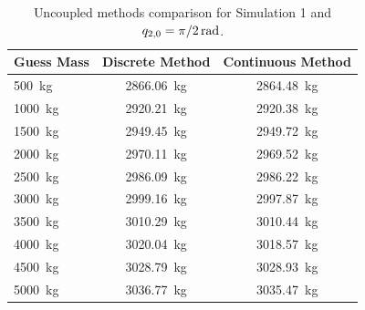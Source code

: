 \documentclass[a4paper,12pt,oneside]{report}
\begin{document}
\begin{table}[t]
  \caption{Uncoupled methods comparison for Simulation 1 and $q_{2,0}=\SI[parse-numbers = false]{\pi/2}{\radian}$.}
  \label{uncoupled_comparison_1}
  \begin{center}
  \begin{tabular}{lcc}
    \toprule
    \textbf{Guess Mass}&\textbf{Discrete Method}&\textbf{Continuous Method}\\
  \midrule
  \SI{500}{\kilogram}&\SI{2866.06}{\kilogram}&\SI{2864.48}{\kilogram}\\
  \SI{1000}{\kilogram}&\SI{2920.21}{\kilogram}&\SI{2920.38}{\kilogram}\\
  \SI{1500}{\kilogram}&\SI{2949.45}{\kilogram}&\SI{2949.72}{\kilogram}\\
  \SI{2000}{\kilogram}&\SI{2970.11}{\kilogram}&\SI{2969.52}{\kilogram}\\
  \SI{2500}{\kilogram}&\SI{2986.09}{\kilogram}&\SI{2986.22}{\kilogram}\\
  \SI{3000}{\kilogram}&\SI{2999.16}{\kilogram}&\SI{2997.87}{\kilogram}\\
  \SI{3500}{\kilogram}&\SI{3010.29}{\kilogram}&\SI{3010.44}{\kilogram}\\
  \SI{4000}{\kilogram}&\SI{3020.04}{\kilogram}&\SI{3018.57}{\kilogram}\\
  \SI{4500}{\kilogram}&\SI{3028.79}{\kilogram}&\SI{3028.93}{\kilogram}\\
  \SI{5000}{\kilogram}&\SI{3036.77}{\kilogram}&\SI{3035.47}{\kilogram}\\
  \bottomrule
  \end{tabular}
  \end{center}
\end{table}
\end{document}

